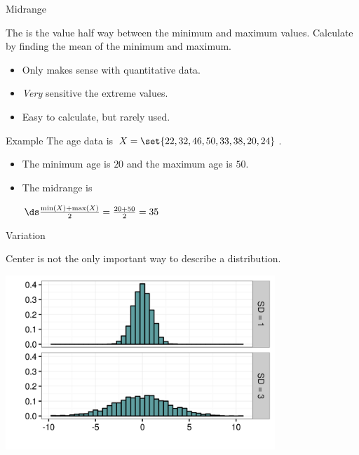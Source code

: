 \documentclass[xcolor=table, aspectratio=169, bigger, handout]{beamer}
\begin{document}
\begin{frame}{Midrange}
\begin{block}{}
The  is the value half way between the minimum and maximum values. Calculate by finding the mean of the minimum and maximum.
\begin{itemize}
\item Only makes sense with quantitative data.
\item \emph{Very} sensitive the extreme values.
\item Easy to calculate, but rarely used.
\end{itemize}
\end{block}

\pause
\begin{exampleblock}{Example}
The age data is $X = \set{22, 32, 46, 50, 33, 38, 20, 24}$.
\begin{itemize}
\item The minimum age is $20$ and the maximum age is $50$.
\item The midrange is \\
\smallskip
{\centering
$\ds \frac {\min(X) + \max(X)}{2} = \frac {20 + 50}{2} = 35$
\par}
\end{itemize}
\smallskip
\end{exampleblock}

\end{frame}

\begin{frame}{Variation}
\begin{block}{}
Center is not the only important way to describe a distribution.
\end{block}
\pause
\bigskip
{\centering
\includegraphics[width=4in]{../images/wk04_var_diff}
\par}
\end{frame}
\end{document}
